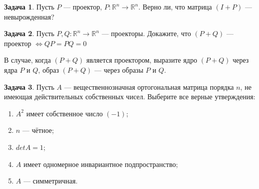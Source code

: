 \documentclass[a4paper,12pt]{article}
\theoremstyle{definition}
\newtheorem{problem}{Задача}
\begin{document}
\begin{problem}
Пусть $P$ --- проектор, $P: \mathbb{R}^n \rightarrow \mathbb{R}^n$. Верно ли, что матрица $(I+P)$ --- невырожденная?
\end{problem}

\begin{problem}
Пусть $P,Q: \mathbb{R}^n \rightarrow \mathbb{R}^n$ --- проекторы. Докажите, что $(P+Q)$ --- проектор $\Leftrightarrow QP = PQ = 0$

В случае, когда $(P+Q)$ является проектором, выразите ядро $(P+Q)$ через ядра $P$ и $Q$, образ $(P+Q)$ --- через образы $P$ и $Q$.
\end{problem}

\begin{problem}
Пусть $A$ --- вещественнозначная ортогональная матрица порядка $n$, не имеющая действительных собственных чисел. Выберите все верные утверждения:
\begin{enumerate}
	\item $A^2$ имеет собственное число $(-1)$;
	\item $n$ --- чётное;
	\item $det A = 1$;
	\item $A$ имеет одномерное инвариантное подпространство;
	\item $A$ --- симметричная.
\end{enumerate}
\end{problem}
\end{document}
